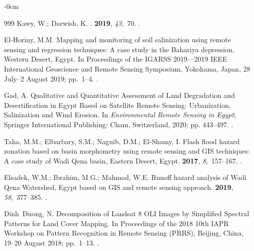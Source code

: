 \documentclass[information,article,accept,pdftex,moreauthors]{Definitions/mdpi}
\begin{document}
\begin{adjustwidth}{-\extralength}{0cm}
\begin{thebibliography}{999}
Kawy, W.; Darwish, K.
.
 {\bf 2019}, {\em
  43},~70.
.

El-Horiny, M.M.
\newblock Mapping and monitoring of soil salinization using remote sensing and
  regression techniques: A case study in the Bahariya depression, Western
  Desert, Egypt.
\newblock In Proceedings of the IGARSS 2019---2019 IEEE International
  Geoscience and Remote Sensing Symposium, Yokohama, Japan, 28 July--2 August  2019; \mbox{pp. 1--4}. %
.

Gad, A. Qualitative and Quantitative Assessment of Land Degradation and
  Desertification in Egypt Based on Satellite Remote Sensing: Urbanization,
  Salinization and Wind Erosion.
\newblock In {\em Environmental Remote Sensing in Egypt}; Springer
  International Publishing: Cham, Switzerland,  2020; pp. 443--497.
.

Taha, M.M.; Elbarbary, S.M.; Naguib, D.M.; El-Shamy, I.
\newblock Flash flood hazard zonation based on basin morphometry using remote
  sensing and GIS techniques: A case study of Wadi Qena basin, Eastern Desert,
  Egypt.
 {\bf
  2017}, {\em 8},~157--167.
.

Elsadek, W.M.; Ibrahim, M.G.; Mahmod, W.E.
\newblock Runoff hazard analysis of Wadi Qena Watershed, Egypt based on GIS and
  remote sensing approach.
 {\bf 2019}, {\em 58},~377--385.
.

Dinh~Duong, N.
\newblock Decomposition of Landsat 8 OLI Images by Simplified Spectral Patterns
  for Land Cover Mapping.
\newblock In Proceedings of the 2018 10th IAPR Workshop on Pattern Recognition
  in Remote Sensing (PRRS), Beijing, China, 19--20 August 2018; \mbox{pp. 1--13}. %
.


\end{thebibliography}
\end{adjustwidth}
\end{document}
